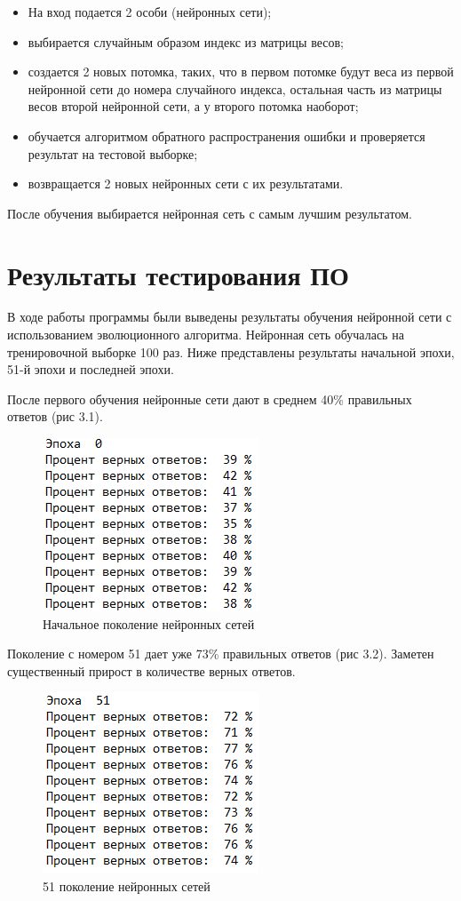 \begin{itemize}
  \item На вход подается 2 особи (нейронных сети);
  \item выбирается случайным образом индекс из матрицы весов;
  \item создается 2 новых потомка, таких, что в первом потомке будут веса из первой нейронной сети до номера случайного индекса, остальная часть из матрицы весов второй нейронной сети, а у второго потомка наоборот;
  \item обучается алгоритмом обратного распространения ошибки и проверяется результат на тестовой выборке;
  \item возвращается 2 новых нейронных сети с их результатами.
\end{itemize}

После обучения выбирается нейронная сеть с самым лучшим результатом.

\section{Результаты тестирования ПО}

\indent \indent В ходе работы программы были выведены результаты обучения нейронной сети с использованием эволюционного алгоритма. Нейронная сеть обучалась на тренировочной выборке 100 раз. Ниже представлены результаты начальной эпохи, 51-й эпохи и последней эпохи.

После первого обучения нейронные сети дают в среднем 40\% правильных ответов (рис 3.1).

\begin{figure}[H]
  \centering
  \includegraphics[width=0.4\linewidth]{./img/0}
  \caption{Начальное поколение нейронных сетей}
  \label{fig:mpr} 
\end{figure}

Поколение с номером 51 дает уже 73\% правильных ответов (рис 3.2). Заметен существенный прирост в количестве верных ответов.

\begin{figure}[H]
  \centering
  \includegraphics[width=0.4\linewidth]{./img/51}
  \caption{51 поколение нейронных сетей}
  \label{fig:mpr} 
\end{figure}

